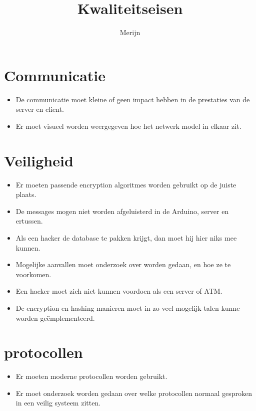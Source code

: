 \documentclass{article}
\author{Merijn}
\title{Kwaliteitseisen}
\begin{document}
\maketitle

\section{Communicatie}

\begin{itemize}
\item De communicatie moet kleine of geen impact hebben in de prestaties van de server en client.
\item Er moet visueel worden weergegeven hoe het netwerk model in elkaar zit.
\end{itemize}

\section{Veiligheid}

\begin{itemize}
\item Er moeten passende encryption algoritmes worden gebruikt op de juiste plaats.
\item De messages mogen niet worden afgeluisterd in de Arduino, server en ertussen.
\item Als een hacker de database te pakken krijgt, dan moet hij hier niks mee kunnen.
\item Mogelijke aanvallen moet onderzoek over worden gedaan, en hoe ze te voorkomen.
\item Een hacker moet zich niet kunnen voordoen als een server of ATM.
\item De encryption en hashing manieren moet in zo veel mogelijk talen kunne worden ge\"emplementeerd.
\end{itemize}

\section{protocollen}

\begin{itemize}
\item Er moeten moderne protocollen worden gebruikt.
\item Er moet onderzoek worden gedaan over welke protocollen normaal gesproken in een veilig systeem zitten.
\end{itemize}
\end{document}
